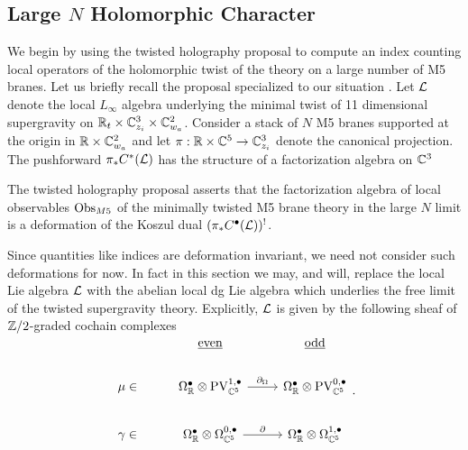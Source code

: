 \subsection{Large $N$ Holomorphic Character}

We begin by using the twisted holography proposal to compute an index counting local operators of the holomorphic twist of the theory on a large number of M5 branes. Let us briefly recall the proposal specialized to our situation . Let $\mathcal L$ denote the local $L_{\infty}$ algebra underlying the minimal twist of 11 dimensional supergravity on $\mathbb{R}_{t}\times \mathbb{C}^{3}_{z_{i}}\times \mathbb{C}^{2}_{w_{a}}$. Consider a stack of $N$ M5 branes supported at the origin in $\mathbb{R}\times \mathbb{C}^{2}_{w_{a}}$ and let $\pi : \mathbb{R}\times \mathbb{C}^{5}\to \mathbb{C}^{3}_{z_{i}}$ denote the canonical projection. The pushforward $\pi_{*} C^{*}(\mathcal L)$ has the structure of a factorization algebra on $\mathbb{C}^{3}$

The twisted holography proposal asserts that the factorization algebra of local observables ${\rm Obs}_{M5}$ of the minimally twisted M5 brane theory in the large $N$ limit is a deformation of the Koszul dual $(\pi_{*} C^{\bullet}(\mathcal L))^{!}$.

Since quantities like indices are deformation invariant, we need not consider such deformations for now. In fact in this section we may, and will, replace the local Lie algebra $\mathcal L$ with the abelian local dg Lie algebra which underlies the free limit of the twisted supergravity theory.
Explicitly, $\mathcal L$ is given by the following sheaf of $\mathbb{Z}/2$-graded cochain complexes
\[
\begin{tikzcd}
  &  \ul{\rm even} & \ul{\rm odd} \\
 \mu \in & \Omega^{\bullet}_{\R}\otimes\PV^{1,\bullet}_{\C^{5}} \ar[r, "\del_{\Omega}"] & \Omega^{\bullet}_{\R}\otimes\PV^{0,\bullet}_{\C^{5}}\\
 \gamma \in & \Omega^{\bullet}_{\R}\otimes\Omega^{0,\bullet}_{\C^{5}} \ar[r, "\del"]
& \Omega^{\bullet}_{\R}\otimes\Omega^{1,\bullet}_{\C^{5}}\end{tikzcd}
.\]


\parsec

%

